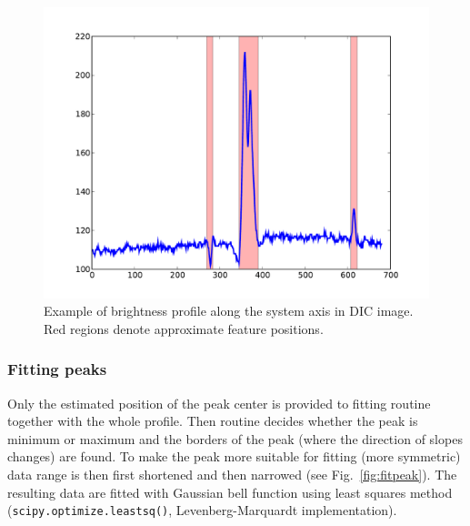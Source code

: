 \begin{figure}%
\includegraphics[width=\columnwidth]{figs/dicaxisprofile.pdf}%
\caption{Example of brightness profile along the system axis in DIC image. Red regions denote approximate feature positions.}%
\label{fig:dicaxisprofile}%
\end{figure}

\subsubsection{Fitting peaks}\label{fitpeak}

Only the estimated position of the peak center is provided to fitting routine together with the whole profile. Then routine decides whether the peak is minimum or maximum and the borders of the peak (where the direction of slopes changes) are found. To make the peak more suitable for fitting (more symmetric) data range is then first shortened and then narrowed (see Fig.~\ref{fig:fitpeak}). The resulting data are fitted with Gaussian bell function using least squares method (\verb|scipy.optimize.leastsq()|, Levenberg-Marquardt implementation).

